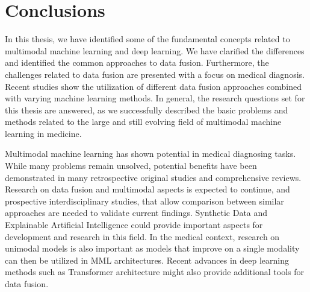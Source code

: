 \chapter{Conclusions\label{conclusions}}

In this thesis, we have identified some of the fundamental concepts related to multimodal machine learning and deep learning. We have clarified the differences and identified the common approaches to data fusion. Furthermore, the challenges related to data fusion are presented with a focus on medical diagnosis. Recent studies show the utilization of different data fusion approaches combined with varying machine learning methods. In general, the research questions set for this thesis are answered, as we successfully described the basic problems and methods related to the large and still evolving field of multimodal machine learning in medicine.

Multimodal machine learning has shown potential in medical diagnosing tasks. While many problems remain unsolved, potential benefits have been demonstrated in many retrospective original studies and comprehensive reviews. Research on data fusion and multimodal aspects is expected to continue, and prospective interdisciplinary studies, that allow comparison between similar approaches are needed to validate current findings. Synthetic Data and Explainable Artificial Intelligence could provide important aspects for development and research in this field. In the medical context, research on unimodal models is also important as models that improve on a single modality can then be utilized in MML architectures. Recent advances in deep learning methods such as Transformer architecture might also provide additional tools for data fusion. 

